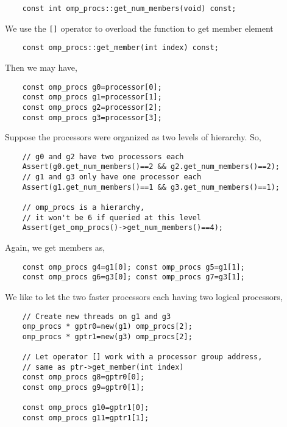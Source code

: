 {\footnotesize
\begin{verbatim}
    const int omp_procs::get_num_members(void) const; 
\end{verbatim}
}

We use the \texttt{[]} operator to overload the function to get member element

{\footnotesize
\begin{verbatim}
    const omp_procs::get_member(int index) const; 
\end{verbatim}
}

Then we may have,

{\footnotesize
\begin{verbatim}
    const omp_procs g0=processor[0];
    const omp_procs g1=processor[1];
    const omp_procs g2=processor[2];
    const omp_procs g3=processor[3];
\end{verbatim}
}

Suppose the processors were organized as two levels of hierarchy. So, 

{\footnotesize
\begin{verbatim}
    // g0 and g2 have two processors each
    Assert(g0.get_num_members()==2 && g2.get_num_members()==2);
    // g1 and g3 only have one processor each
    Assert(g1.get_num_members()==1 && g3.get_num_members()==1);

    // omp_procs is a hierarchy,
    // it won't be 6 if queried at this level
    Assert(get_omp_procs()->get_num_members()==4);
\end{verbatim}
}

Again, we get members as,

{\footnotesize
\begin{verbatim}
    const omp_procs g4=g1[0]; const omp_procs g5=g1[1];
    const omp_procs g6=g3[0]; const omp_procs g7=g3[1];
\end{verbatim}
}

We like to let the two faster processors each having two logical processors,

{\footnotesize
\begin{verbatim}
    // Create new threads on g1 and g3
    omp_procs * gptr0=new(g1) omp_procs[2];
    omp_procs * gptr1=new(g3) omp_procs[2];

    // Let operator [] work with a processor group address, 
    // same as ptr->get_member(int index)
    const omp_procs g8=gptr0[0];
    const omp_procs g9=gptr0[1];

    const omp_procs g10=gptr1[0];
    const omp_procs g11=gptr1[1];
\end{verbatim}
}

